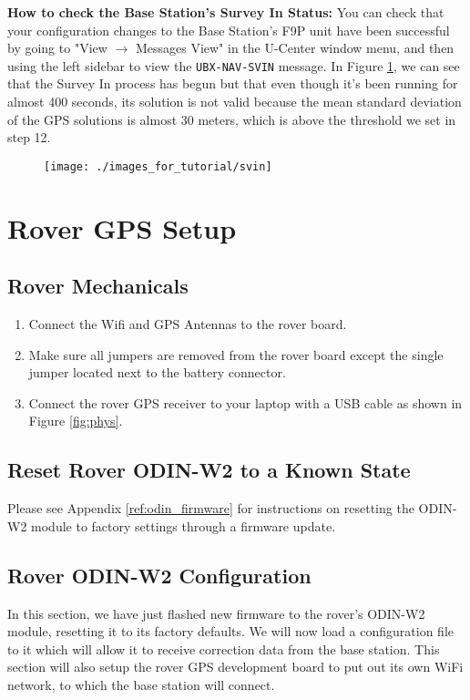 \documentclass{article}%
\begin{document}
	\begin{myquote}
	\textbf{How to check the Base Station's Survey In Status:} You can check that your configuration changes to the Base Station's F9P unit have been successful by going to "View $\rightarrow$ Messages View" in the U-Center window menu, and then using the left sidebar to view the \texttt{UBX-NAV-SVIN} message.  In Figure \ref{fig:svin}, we can see that the Survey In process has begun but that even though it's been running for almost 400 seconds, its solution is not valid because the mean standard deviation of the GPS solutions is almost 30 meters, which is above the threshold we set in step 12. 
	\end{myquote}

	\begin{figure}
		\centering
		\texttt{[image: ./images\_for\_tutorial/svin]}
		\label{fig:svin}
	\end{figure}

\section{Rover GPS Setup}
\subsection{Rover Mechanicals}
	\begin{enumerate}
		\item Connect the Wifi and GPS Antennas to the rover board.
		\item Make sure all jumpers are removed from the rover board except the single jumper located next to the battery connector.
		\item Connect the rover GPS receiver to your laptop with a USB cable as shown in Figure \ref{fig:phys}.
	\end{enumerate}

\subsection{Reset Rover ODIN-W2 to a Known State}
Please see Appendix \ref{ref:odin_firmware} for instructions on resetting the ODIN-W2 module to factory settings through a firmware update.

\subsection{Rover ODIN-W2 Configuration}
In this section, we have just flashed new firmware to the rover's ODIN-W2 module, resetting it to its factory defaults.  We will now load a configuration file to it which will allow it to receive correction data from the base station.  This section will also setup the rover GPS development board to put out its own WiFi network, to which the base station will connect.
\end{document}
